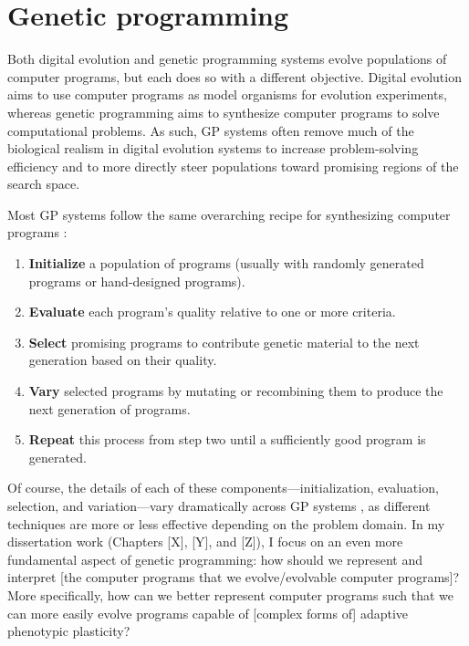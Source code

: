 \section{Genetic programming}


Both digital evolution and genetic programming systems evolve populations of computer programs, but each does so with a different objective.
Digital evolution aims to use computer programs as model organisms for evolution experiments, whereas genetic programming aims to synthesize computer programs to solve computational problems.
As such, GP systems often remove much of the biological realism in digital evolution systems to increase problem-solving efficiency and to more directly steer populations toward promising regions of the search space.

Most GP systems follow the same overarching recipe for synthesizing computer programs \citep{ofria_avida:_2009}:

\begin{displayquote}
\begin{enumerate}
    \item \textbf{Initialize} a population of programs (usually with randomly generated programs or hand-designed programs).
    \item \textbf{Evaluate} each program's quality relative to one or more criteria.
    \item \textbf{Select} promising programs to contribute genetic material to the next generation based on their quality.
    \item \textbf{Vary} selected programs by mutating or recombining them to produce the next generation of programs. 
    \item \textbf{Repeat} this process from step two until a sufficiently good program is generated.
\end{enumerate}
\end{displayquote}

Of course, the details of each of these components---initialization, evaluation, selection, and variation---vary dramatically across GP systems \citep{poli_field_2008}, as different techniques are more or less effective depending on the problem domain.
In my dissertation work (Chapters [X], [Y], and [Z]), I focus on an even more fundamental aspect of genetic programming: how should we represent and interpret [the computer programs that we evolve/evolvable computer programs]? 
More specifically, how can we better represent computer programs such that we can more easily evolve programs capable of [complex forms of] adaptive phenotypic plasticity?

